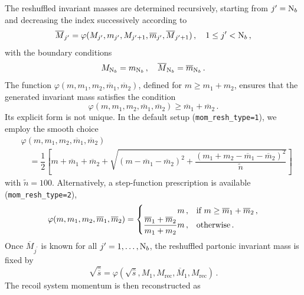 The reshuffled invariant masses are determined recursively, starting from $j^\prime={\rm N}_b$ and decreasing the index successively according to
\begin{equation}
    \overline{M}_{j^\prime} = \varphi(M_{j^\prime},m_{j^\prime},M_{j^\prime+1},\overline{m}_{j^\prime},\overline{M}_{j^\prime+1})\,,\quad 1\leq j^\prime<{\rm N}_b\,,
\end{equation}
with the boundary conditions
\begin{equation}
    M_{{\rm N}_b} = m_{{\rm N}_b}\,,\quad \overline{M}_{{\rm N}_b} = \overline{m}_{{\rm N}_b}\,.
\end{equation}
The function $\varphi(m,m_1,m_2,\overline{m}_1,\overline{m}_2)$, defined for $m\geq m_1+m_2$, ensures that the generated invariant mass satisfies the condition
\begin{equation}
\varphi(m,m_1,m_2,\overline{m}_1,\overline{m}_2)
\geq
\overline{m}_1+\overline{m}_2\,.
\end{equation}
Its explicit form is not unique. In the default setup (\texttt{mom\_resh\_type=1}), we employ the smooth choice
\begin{align}
    & \varphi(m,m_1,m_2,\overline{m}_1,\overline{m}_2)
    \nonumber\\
    & \quad =\dfrac{1}{2}\left[ m+\overline{m}_1+\overline{m}_2+\sqrt{\left(m-\overline{m}_1-\overline{m}_2\right)^2+\dfrac{\left(m_1+m_2-\overline{m}_1-\overline{m}_2\right)^2}{\tilde{n}}} \right]
\label{eq:varphiformomreshtype1}
\end{align}
with $\tilde{n}=100$. Alternatively, a step-function prescription is available (\texttt{mom\_resh\_type=2}),
\begin{equation}
    \varphi(m,m_1,m_2,\overline{m}_1,\overline{m}_2) = 
    \begin{cases}
        \hfill m\,,& \text{if}\ m\ge \overline{m}_1+\overline{m}_2\,, \\
        \dfrac{\overline{m}_1+\overline{m}_2}{m_1+m_2}m\,,& \text{otherwise}\,.
    \end{cases}
\label{eq:varphiformomreshtype2}
\end{equation}
Once $\overline{M}_{j^\prime}$ is known for all $j^\prime=1,\dots,{\rm N}_b$, the reshuffled partonic invariant mass is fixed by
\begin{equation}
    \sqrt{\hat{\overline{s}}} = \varphi(\sqrt{\hat{s}},M_{1},M_\mathrm{rec},\overline{M}_{1},M_\mathrm{rec})\,.
\label{eq:overlineshat1}
\end{equation}
The recoil system momentum is then reconstructed as
